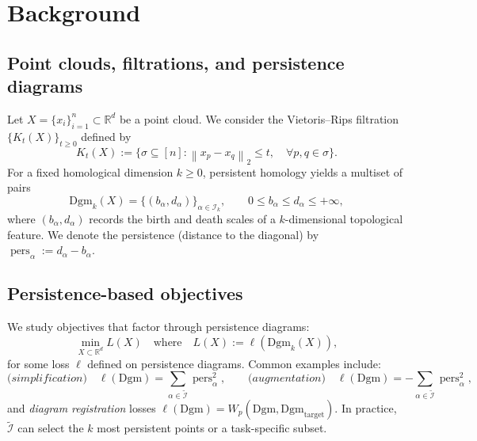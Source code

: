 \documentclass{article} %
\newcommand{\R}{\mathbb{R}}
\newcommand{\Dgm}{\mathrm{Dgm}}
\newcommand*{\norm}[1]{\left\|#1\right\|}
\newcommand{\pers}{\operatorname{pers}}
\theoremstyle{plain}
\theoremstyle{definition}
\theoremstyle{remark}
\begin{document}
\section{Background}
\subsection{Point clouds, filtrations, and persistence diagrams}
Let $X = \{ x_i \}_{i = 1}^n \subset \R^d$ be a point cloud. We consider the Vietoris--Rips filtration
$\{ K_t(X) \}_{t \ge 0}$ defined by
\[ K_t(X) := \Big\{\sigma \subseteq [n] : \norm{x_p - x_q}_2 \le t, \quad \forall p, q \in \sigma \Big\}. \]
For a fixed homological dimension $k\ge 0$, persistent homology yields a multiset of pairs
    \[ \Dgm_k(X)= \{(b_\alpha, d_\alpha) \}_{\alpha \in \mathcal{I}_k}, \qquad 0 \le b_\alpha \le d_\alpha \le + \infty, \]
where $(b_\alpha, d_\alpha)$ records the birth and death scales of a $k$-dimensional topological feature.
We denote the persistence (distance to the diagonal) by $\pers_\alpha := d_\alpha - b_\alpha.$

\subsection{Persistence-based objectives}
We study objectives that factor through persistence diagrams:
\begin{equation} \label{eq:objective}
  \min_{X \subset \R^d}  L(X) \quad \text{where} \quad L(X) := \ell(\Dgm_k(X)),
\end{equation}
for some loss $\ell$ defined on persistence diagrams.
Common examples include:
    \[ \textit{(simplification)} \quad \ell(\Dgm) = \sum_{\alpha \in \tilde{\mathcal{I}}} \pers_\alpha^2, \qquad \textit{(augmentation)} \quad \ell(\Dgm) = -\sum_{\alpha \in \tilde{\mathcal{I}}} \pers_\alpha^2, \]
and \emph{diagram registration} losses $\ell(\Dgm) = W_p(\Dgm, \Dgm_{\mathrm{target}})$. In practice, $\tilde{\mathcal{I}}$ can select the $k$ most persistent points or a task-specific subset.
\end{document}
